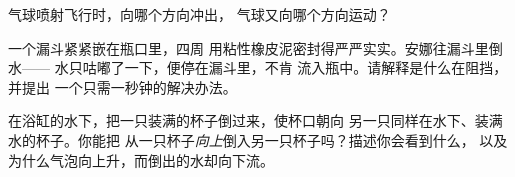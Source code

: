 \begin{exercise}[$\star$]\label{exo:g2:air-around-us:8}
气球喷射飞行时，向哪个方向冲出，
气球又向哪个方向运动？
\end{exercise}

\begin{exercise}[$\star\star$]\label{exo:g2:air-around-us:9}
一个漏斗紧紧嵌在瓶口里，四周
用粘性橡皮泥密封得严严实实。安娜往漏斗里倒水——
水只咕嘟了一下，便停在漏斗里，不肯
流入瓶中。请解释是什么在阻挡，并提出
一个只需一秒钟的解决办法。
\end{exercise}

\begin{exercise}[$\star\star$]\label{exo:g2:air-around-us:10}
在浴缸的水下，把一只装满的杯子倒过来，使杯口朝向
另一只同样在水下、装满水的杯子。你能把
从一只杯子\emph{向上}倒入另一只杯子吗？描述你会看到什么，
以及为什么气泡向上升，而倒出的水却向下流。
\end{exercise}
